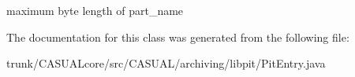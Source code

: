 maximum byte length of part\-\_\-name 

The documentation for this class was generated from the following file\-:\begin{DoxyCompactItemize}
\item 
trunk/\-C\-A\-S\-U\-A\-Lcore/src/\-C\-A\-S\-U\-A\-L/archiving/libpit/Pit\-Entry.\-java\end{DoxyCompactItemize}
